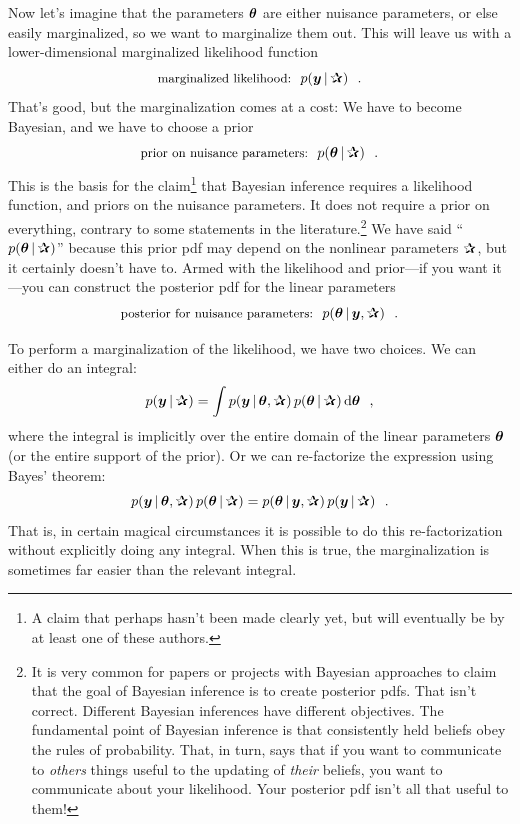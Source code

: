 Now let's imagine that the parameters $\boldsymbol{\theta}$ are either nuisance
parameters, or else easily marginalized, so we want to marginalize
them out.
This will leave us with a lower-dimensional marginalized likelihood
function
\begin{equation}
\mbox{\small marginalized likelihood:} \hquad p(\vy\given\bP) \hquad.
\end{equation}
That's good, but the marginalization comes at a cost:
We have to become Bayesian, and we have to choose a prior
\begin{equation}
\mbox{\small prior on nuisance parameters:} \hquad p(\vtheta\given\bP) \hquad.
\end{equation}
This is the basis for the claim\footnote{A claim that perhaps hasn't been made clearly
  yet, but will eventually be by at least one of these authors.} that Bayesian
inference requires a likelihood function, and priors on the nuisance parameters.
It does not require a prior on everything, contrary to some statements
in the literature.\footnote{It is very common for papers or projects with
  Bayesian approaches to claim that the
  goal of Bayesian inference is to create posterior pdfs. That isn't correct.
  Different Bayesian inferences have different objectives. The fundamental
  point
  of Bayesian inference is that consistently held beliefs obey the rules of
  probability. That, in turn, says that if you want
  to communicate to \emph{others} things useful to the
  updating of \emph{their} beliefs, you want to communicate about your likelihood.
  Your posterior pdf isn't all that useful to them!\label{note:lf}}
We have said ``$p(\vtheta\given\bP)$'' because this prior pdf may depend on
the nonlinear parameters $\bP$, but it certainly doesn't have to.
Armed with the likelihood and prior---if you want it---you can construct
the posterior pdf for the linear parameters
\begin{equation}
\mbox{\small posterior for nuisance parameters:} \hquad p(\vtheta\given\vy,\bP) \hquad.
\end{equation}

To perform a marginalization of the likelihood, we have two choices.
We can either do an integral:
\begin{equation}\label{eq:integral}
p(\vy\given\bP) = \int p(\vy\given\vtheta,\bP)\,p(\vtheta\given\bP)\,\dd\vtheta
\hquad,
\end{equation}
where the integral is implicitly over the entire domain of the
linear parameters $\boldsymbol{\theta}$ (or the entire support of the prior).
Or we can re-factorize the expression using Bayes' theorem:
\begin{equation}
p(\vy\given\vtheta,\bP)\,p(\vtheta\given\bP)
 = p(\vtheta\given\vy,\bP)\,p(\vy\given\bP)
\hquad.
\end{equation}
That is, in certain magical circumstances it is possible to do this
re-factorization without explicitly doing any integral.
When this is true, the marginalization is sometimes far easier than
the relevant integral.

